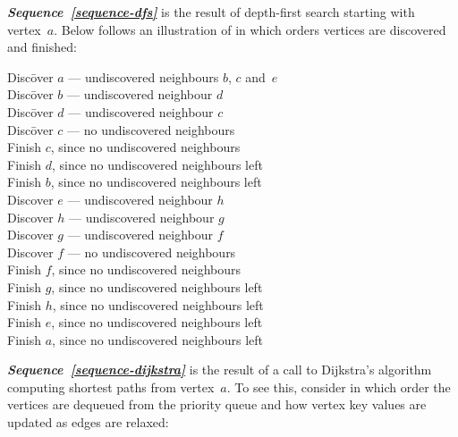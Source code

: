 \documentclass{jn-pset}
\begin{document}
\begin{problem}
\begin{solution}
  
  \textit{\textbf{Sequence~\ref{sequence-dfs}}}
  is the result of depth-first
  search starting with vertex~$a$.
  Below follows an illustration of in which orders vertices are
  discovered and finished: \\
  \vspace{-6.0mm}
  \begin{tabbing}
    Disco\={}ver  $a$ --- undiscovered neighbours $b$, $c$ and~$e$
    \\
    \> Disco\={}ver  $b$ --- undiscovered neighbour $d$
    \\
    \> \> Disco\={}ver  $d$  --- undiscovered neighbour $c$
    \\
    \> \> \> Disco\={}ver  $c$ --- no undiscovered neighbours
    \\
    \> \> \> Finish $c$, since no undiscovered neighbours
    \\
    \> \> Finish $d$, since no undiscovered neighbours left
    \\
    \> Finish $b$, since no undiscovered neighbours left
    \\
    \> Discover $e$ --- undiscovered neighbour $h$
    \\
    \> \> Discover $h$  --- undiscovered neighbour $g$
    \\
    \> \> \> Discover $g$  --- undiscovered neighbour $f$
    \\
    \> \> \> \> Discover $f$ --- no undiscovered neighbours
    \\
    \> \> \> \> Finish $f$, since no undiscovered neighbours 
    \\
    \> \> \> Finish $g$, since no undiscovered neighbours left
    \\
    \> \> Finish $h$, since no undiscovered neighbours left
    \\
    \> Finish $e$, since no undiscovered neighbours left
    \\
    Finish $a$, since no undiscovered neighbours left
  \end{tabbing}
  
  
  \textit{\textbf{Sequence~\ref{sequence-dijkstra}}}
  is the result of a call to Dijkstra's algorithm computing shortest
  paths from vertex~$a$.
  To see this, consider in which order the vertices are dequeued from
  the priority queue and how vertex key values are updated as edges
  are relaxed:


\end{solution}
\end{problem}
\end{document}
